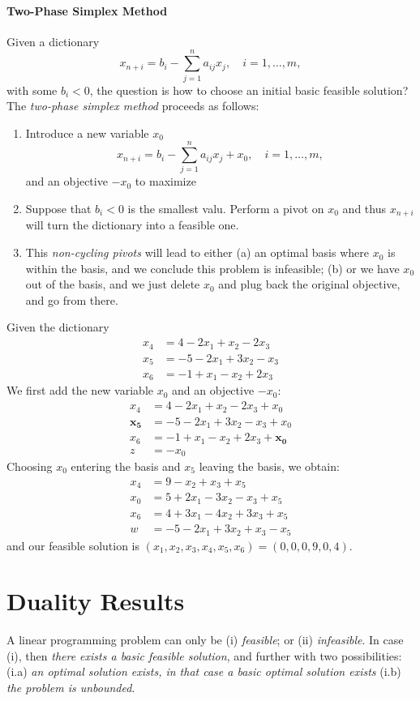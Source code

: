 \paragraph{Two-Phase Simplex Method}
Given a dictionary
\[
x_{n+i}=b_i-\sum_{j=1}^na_{ij}x_j,\quad i=1,\dots,m,
\]
with some $b_i<0$, the question is how to choose an initial basic feasible solution? The \emph{two-phase simplex method} proceeds as follows:
\begin{enumerate}
\item
Introduce a new variable $x_0$
\[
x_{n+i}=b_i-\sum_{j=1}^na_{ij}x_j+x_0,\quad i=1,\dots,m,
\]
and an objective $-x_0$ to maximize
\item
Suppose that $b_i<0$ is the smallest valu. Perform a pivot on $x_0$ and thus $x_{n+i}$ will turn the dictionary into a feasible one.
\item
This \emph{non-cycling pivots} will lead to either (a) an optimal basis where $x_0$ is within the basis, and we conclude this problem is infeasible; (b) or we have $x_0$ out of the basis, and we just delete $x_0$ and plug back the original objective, and go from there.
\end{enumerate}
\begin{example}
Given the dictionary 
\begin{align*}
x_4&=4-2x_1+x_2-2x_3\\
x_5&=-5-2x_1+3x_2-x_3\\
x_6&=-1+x_1-x_2+2x_3
\end{align*}
We first add the new variable $x_0$ and an objective $-x_0$:
\begin{align*}
x_4&=4-2x_1+x_2-2x_3+x_0\\
\bm{x_5}&=-5-2x_1+3x_2-x_3+x_0\\
x_6&=-1+x_1-x_2+2x_3+\bm{x_0}\\
z&=-x_0
\end{align*}
Choosing $x_0$ entering the basis and $x_5$ leaving the basis, we obtain:
\begin{align*}
x_4&=9-x_2+x_3+x_5\\
x_0&=5+2x_1-3x_2-x_3+x_5\\
x_6&=4+3x_1-4x_2+3x_3+x_5\\
w&=-5-2x_1+3x_2+x_3-x_5
\end{align*}
and our feasible solution is $(x_1,x_2,x_3,x_4,x_5,x_6)=(0,0,0,9,0,4)$.
\end{example}

\section{Duality Results}
\begin{theorem}
A linear programming problem can only be (i) \emph{feasible}; or (ii) \emph{infeasible}. In case (i), then \emph{there exists a basic feasible solution}, and further with two possibilities: (i.a) \emph{an optimal solution exists, in that case a basic optimal solution exists} (i.b) \emph{the problem is unbounded}.
\end{theorem}

